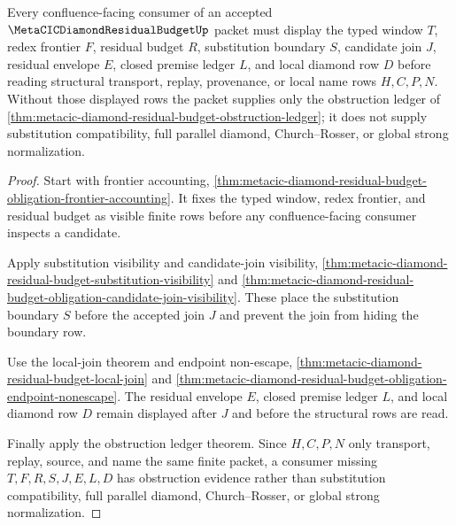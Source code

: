 \begin{theorem}
\label{thm:metacic-diamond-residual-budget-obligation-witness-cut}
Every confluence-facing consumer of an accepted $\MetaCICDiamondResidualBudgetUp$ packet must display the typed window $T$, redex frontier $F$, residual budget $R$, substitution boundary $S$, candidate join $J$, residual envelope $E$, closed premise ledger $L$, and local diamond row $D$ before reading structural transport, replay, provenance, or local name rows $H,C,P,N$. Without those displayed rows the packet supplies only the obstruction ledger of \autoref{thm:metacic-diamond-residual-budget-obstruction-ledger}; it does not supply substitution compatibility, full parallel diamond, Church--Rosser, or global strong normalization.
\end{theorem}
\begin{proof}
Start with frontier accounting, \autoref{thm:metacic-diamond-residual-budget-obligation-frontier-accounting}. It fixes the typed window, redex frontier, and residual budget as visible finite rows before any confluence-facing consumer inspects a candidate.

Apply substitution visibility and candidate-join visibility, \autoref{thm:metacic-diamond-residual-budget-substitution-visibility} and \autoref{thm:metacic-diamond-residual-budget-obligation-candidate-join-visibility}. These place the substitution boundary $S$ before the accepted join $J$ and prevent the join from hiding the boundary row.

Use the local-join theorem and endpoint non-escape, \autoref{thm:metacic-diamond-residual-budget-local-join} and \autoref{thm:metacic-diamond-residual-budget-obligation-endpoint-nonescape}. The residual envelope $E$, closed premise ledger $L$, and local diamond row $D$ remain displayed after $J$ and before the structural rows are read.

Finally apply the obstruction ledger theorem. Since $H,C,P,N$ only transport, replay, source, and name the same finite packet, a consumer missing $T,F,R,S,J,E,L,D$ has obstruction evidence rather than substitution compatibility, full parallel diamond, Church--Rosser, or global strong normalization.
\end{proof}

